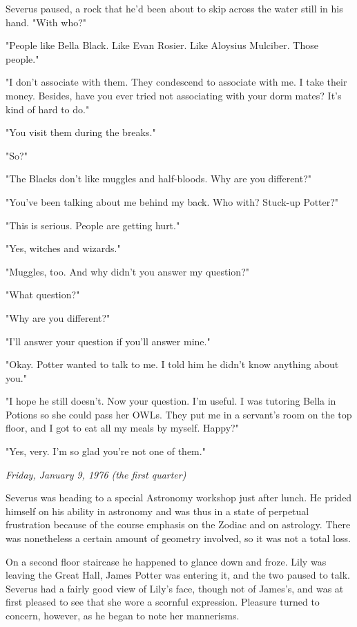 \documentclass[a4paper,11pt]{article}
\begin{document}
Severus paused, a rock that he'd been about to skip across the water still in his hand. "With who?"

"People like Bella Black. Like Evan Rosier. Like Aloysius Mulciber. Those people."

"I don't associate with them. They condescend to associate with me. I take their money. Besides, have you ever tried not associating with your dorm mates? It's kind of hard to do."

"You visit them during the breaks."

"So?"

"The Blacks don't like muggles and half-bloods. Why are you different?"

"You've been talking about me behind my back. Who with? Stuck-up Potter?"

"This is serious. People are getting hurt."

"Yes, witches and wizards."

"Muggles, too. And why didn't you answer my question?"

"What question?"

"Why are you different?"

"I'll answer your question if you'll answer mine."

"Okay. Potter wanted to talk to me. I told him he didn't know anything about you."

"I hope he still doesn't. Now your question. I'm useful. I was tutoring Bella in Potions so she could pass her OWLs. They put me in a servant's room on the top floor, and I got to eat all my meals by myself. Happy?"

"Yes, very. I'm so glad you're not one of them."

\emph{Friday, January 9, 1976 (the first quarter)}

Severus was heading to a special Astronomy workshop just after lunch. He prided himself on his ability in astronomy and was thus in a state of perpetual frustration because of the course emphasis on the Zodiac and on astrology. There was nonetheless a certain amount of geometry involved, so it was not a total loss.

On a second floor staircase he happened to glance down and froze. Lily was leaving the Great Hall, James Potter was entering it, and the two paused to talk. Severus had a fairly good view of Lily's face, though not of James's, and was at first pleased to see that she wore a scornful expression. Pleasure turned to concern, however, as he began to note her mannerisms.
\end{document}
